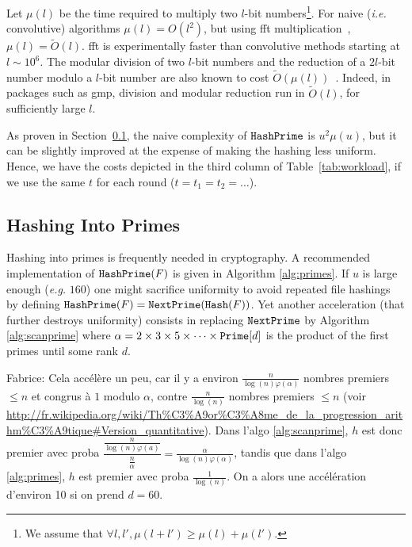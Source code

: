 \documentclass[11pt]{llncs}
\newcommand{\Oapp}{\ensuremath{\tilde{O}}}
\newcommand{\comm}[1]{\marginpar{%
\vskip-\baselineskip %
\raggedright\footnotesize
\itshape\hrule\smallskip#1\par\smallskip\hrule}}
\begin{document}
Let $\mu(l)$ be the time required to multiply two $l$-bit numbers\footnote{We assume that $\forall l,l', \mu(l+l') \ge \mu(l) + \mu(l')$.}.
For naive ({\sl i.e.} convolutive) algorithms $\mu(l) = O(l^2)$, but using {\sc fft} multiplication~\cite{schonhage1971schnelle}, $\mu(l) = \Oapp(l)$. {\sc fft} is experimentally faster than convolutive methods starting at $l \sim 10^6$.
The modular division of two $l$-bit numbers and the reduction of a $2l$-bit number modulo a $l$-bit number are also known to cost $\Oapp(\mu(l))$~\cite{burnikel1998fast}.
Indeed, in packages such as {\sf gmp}, division and modular reduction run in $\Oapp(l)$, for sufficiently large $l$.\smallskip

As proven in Section~\ref{sec:hashprime}, the naive complexity of $\tt HashPrime$ is $u^2 \mu(u)$, but it can be slightly improved at the expense of making the hashing less uniform.
Hence, we have the costs depicted in the third column of Table~\ref{tab:workload}, if we use the same $t$ for each round ($t=t_1=t_2=\dots$).

\subsection{Hashing Into Primes}
\label{sec:hashprime}
Hashing into primes is frequently needed in cryptography. A recommended implementation of $\mbox{{\tt HashPrime}}(F)$ is given in Algorithm \ref{alg:primes}. If $u$ is large enough ({\sl e.g.} $160$) one might sacrifice uniformity to avoid repeated file hashings by defining $\mbox{{\tt HashPrime}}(F)=\mbox{{\tt NextPrime}}(\mbox{{\tt Hash}}(F))$. 
Yet another acceleration (that further destroys uniformity) consists in replacing $\mbox{{\tt NextPrime}}$ by Algorithm \ref{alg:scanprime} where $\alpha=2\times 3\times 5\times \cdots \times \mbox{{\tt Prime}}[d]$ is the product of the first primes until some rank $d$.
\comm{analyse ci-contre}

Fabrice: Cela accélère un peu, car il y a environ $\frac{n}{\log(n) \varphi(\alpha)}$ nombres premiers $\le n$ et congrus à $1$ modulo $\alpha$, contre $\frac{n}{\log(n)}$ nombres premiers $\le n$ (voir \url{http://fr.wikipedia.org/wiki/Th%C3%A9or%C3%A8me_de_la_progression_arithm%C3%A9tique#Version_quantitative}).
Dans l'algo \ref{alg:scanprime}, $h$ est donc premier avec proba $\dfrac{\frac{n}{\log(n) \varphi(a)}}{\frac{n}{\alpha}} = \frac{\alpha}{\log(n) \varphi(\alpha)}$, tandis que dans l'algo \ref{alg:primes}, $h$ est premier avec proba $\frac{1}{\log(n)}$.
On a alors une accélération d'environ 10 si on prend $d=60$.
\end{document}
